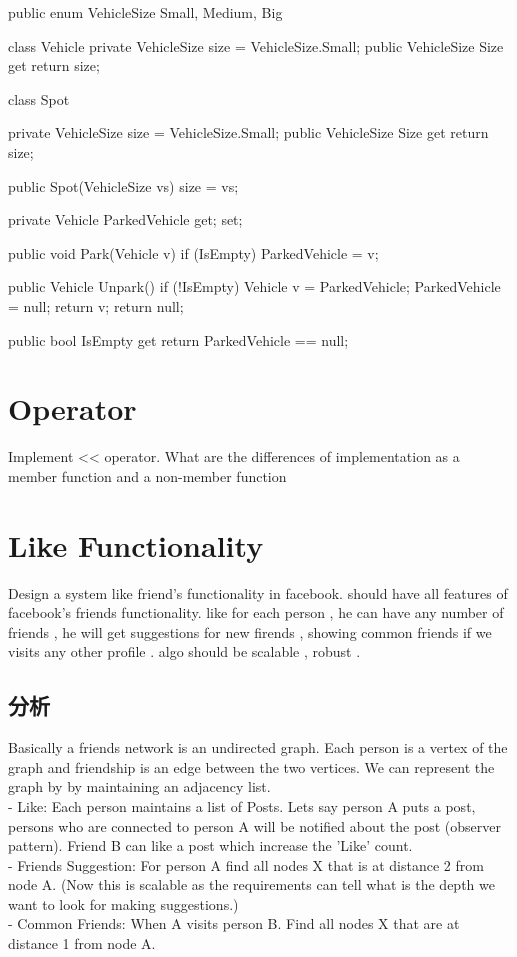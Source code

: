 \begin{Code}
	public enum VehicleSize { Small, Medium, Big }

	class Vehicle {
		private VehicleSize size = VehicleSize.Small;
		public VehicleSize Size {
			get { return size; }
		}
	}
	
	class Spot {
		private VehicleSize size = VehicleSize.Small;
		public VehicleSize Size{
			get { return size; }
		}
		
		public Spot(VehicleSize vs) {
			size = vs;
		}
		
		private Vehicle ParkedVehicle { get; set; }
		
		public void Park(Vehicle v) {
			if (IsEmpty){
				ParkedVehicle = v;
			}
		}
		
		public Vehicle Unpark() {
			if (!IsEmpty) {
				Vehicle v = ParkedVehicle;
				ParkedVehicle = null;
				return v;
			}
			return null;
		}
		
		public bool IsEmpty {
			get { return ParkedVehicle == null; }
		}
	}
\end{Code}

\section{Operator}
Implement << operator. What are the differences of implementation as a member function and a non-member function

\section{Like Functionality}
Design a system like friend's functionality in facebook. should have all features of facebook's friends functionality. like for each person , he can have any number of friends , 
he will get suggestions for new firends , showing common friends if we visits any other profile . algo should be scalable , robust .

\subsection{分析}
Basically a friends network is an undirected graph. Each person is a vertex of the graph and friendship is an edge between the two vertices. We can represent the graph by by 
maintaining an adjacency list. \\
- Like: Each person maintains a list of Posts. Lets say person A puts a post, persons who are connected to person A will be notified about the post (observer pattern). Friend B 
can like a post which increase the 'Like' count. \\
- Friends Suggestion: For person A find all nodes X that is at distance 2 from node A. (Now this is scalable as the requirements can tell what is the depth we want to look for 
making suggestions.) \\
- Common Friends: When A visits person B. Find all nodes X that are at distance 1 from node A.

